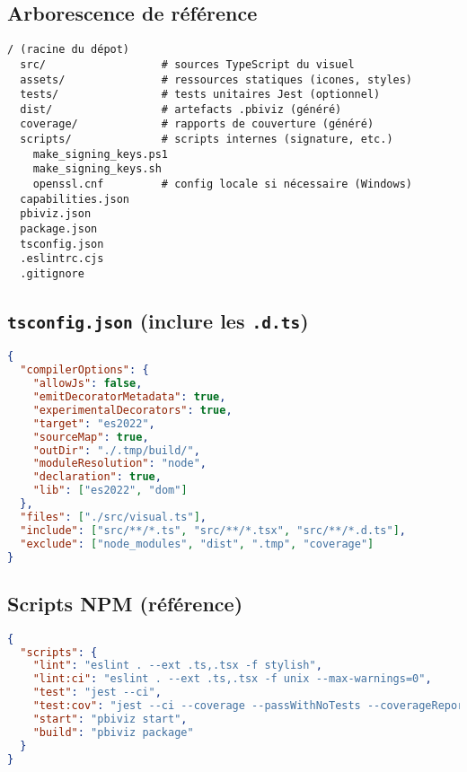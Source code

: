 \subsection{Arborescence de référence}
\begin{lstlisting}[basicstyle=\ttfamily\small]
/ (racine du dépot)
  src/                  # sources TypeScript du visuel
  assets/               # ressources statiques (icones, styles)
  tests/                # tests unitaires Jest (optionnel)
  dist/                 # artefacts .pbiviz (généré)
  coverage/             # rapports de couverture (généré)
  scripts/              # scripts internes (signature, etc.)
    make_signing_keys.ps1
    make_signing_keys.sh
    openssl.cnf         # config locale si nécessaire (Windows)
  capabilities.json
  pbiviz.json
  package.json
  tsconfig.json
  .eslintrc.cjs
  .gitignore
\end{lstlisting}

\subsection{\texttt{tsconfig.json} (inclure les \texttt{.d.ts})}
\begin{lstlisting}[language=json,basicstyle=\ttfamily\small,breaklines=true,columns=fullflexible]
{
  "compilerOptions": {
    "allowJs": false,
    "emitDecoratorMetadata": true,
    "experimentalDecorators": true,
    "target": "es2022",
    "sourceMap": true,
    "outDir": "./.tmp/build/",
    "moduleResolution": "node",
    "declaration": true,
    "lib": ["es2022", "dom"]
  },
  "files": ["./src/visual.ts"],
  "include": ["src/**/*.ts", "src/**/*.tsx", "src/**/*.d.ts"],
  "exclude": ["node_modules", "dist", ".tmp", "coverage"]
}
\end{lstlisting}

\subsection{Scripts NPM (référence)}
\begin{lstlisting}[language=json,basicstyle=\ttfamily\small,breaklines=true,columns=fullflexible]
{
  "scripts": {
    "lint": "eslint . --ext .ts,.tsx -f stylish",
    "lint:ci": "eslint . --ext .ts,.tsx -f unix --max-warnings=0",
    "test": "jest --ci",
    "test:cov": "jest --ci --coverage --passWithNoTests --coverageReporters=json-summary --coverageReporters=text --coverageReporters=lcov",
    "start": "pbiviz start",
    "build": "pbiviz package"
  }
}
\end{lstlisting}

